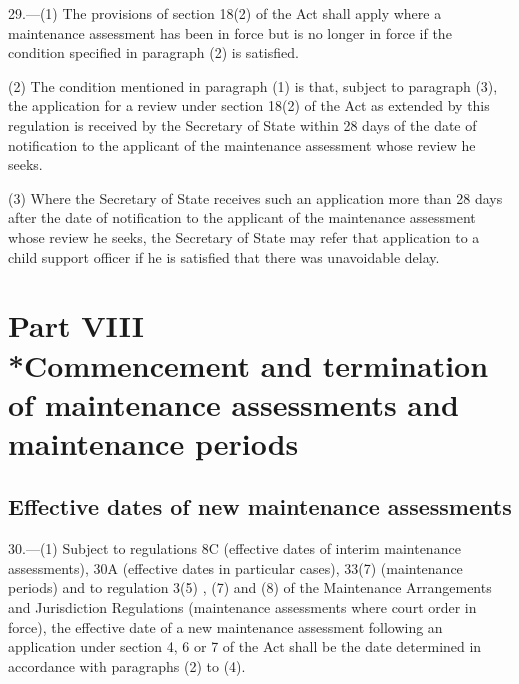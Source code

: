 \documentclass[a4paper]{article}
\newcommand{\parthead}{}
\begin{document}
29.—(1) The provisions of section 18(2) of the Act shall apply where a maintenance assessment has been in force but is no longer in force if the condition specified in paragraph (2) is satisfied.

(2) The condition mentioned in paragraph (1) is that, subject to paragraph (3), the application for a review under section 18(2) of the Act as extended by this regulation is received by the Secretary of State within 28 days of the date of notification to the applicant of the maintenance assessment whose review he seeks.

(3) Where the Secretary of State receives such an application more than 28 days after the date of notification to the applicant of the maintenance assessment whose review he seeks, the Secretary of State may refer that application to a child support officer if he is satisfied that there was unavoidable delay.

\section[Part VIII --- Commencement and termination of maintenance assessments and maintenance periods]{Part VIII\\*Commencement and termination of maintenance assessments and maintenance periods}

\renewcommand\parthead{--- Part VIII}

\subsection[30. Effective dates of new maintenance assessments]{Effective dates of new maintenance assessments}

30.—(1) Subject to 
regulations 8C (effective dates of interim maintenance assessments), 30A (effective dates in particular cases), 33(7) (maintenance periods)  %
and to regulation 3(5)%
, (7) and (8)  %
of the Maintenance Arrangements and Jurisdiction Regulations (maintenance assessments where court order in force),  %
 the effective date of a new maintenance assessment following an application under section 4, 6 or 7 of the Act shall be the date determined in accordance with paragraphs (2) to (4).
\end{document}
